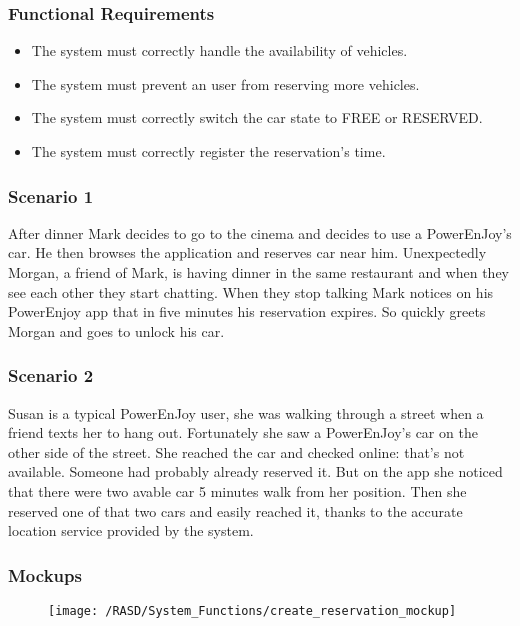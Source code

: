 \subsubsection{Functional Requirements}
\begin{itemize}
  \item The system must correctly handle the availability of vehicles.
  \item The system must prevent an user from reserving more vehicles.
  \item The system must correctly switch the car state to FREE or RESERVED.
  \item The system must correctly register the reservation's time.
\end{itemize}

\subsubsection{Scenario 1}
After dinner Mark decides to go to the cinema and decides to use a PowerEnJoy's car. He then browses the application and reserves car near him.
Unexpectedly Morgan, a friend of Mark, is having dinner in the same restaurant and when they see each other they start chatting. When they stop talking Mark notices on his PowerEnjoy app that in five minutes his reservation expires. So quickly greets Morgan and goes to unlock his car.

\subsubsection{Scenario 2}
Susan is a typical PowerEnJoy user, she was walking through a street when a friend texts her to hang out. Fortunately she saw a PowerEnJoy's car on the other side of the street. She reached the car and checked online: that's not available. Someone had probably already reserved it. But on the app she noticed that there were two avable car 5 minutes walk from her position. Then she reserved one of that two cars and easily reached it, thanks to the accurate location service provided by the system. 


\subsubsection{Mockups}
\begin{figure}[!ht]
  \centering
  \vspace{0.1cm}
  \texttt{[image: /RASD/System\_Functions/create\_reservation\_mockup]}\\
  \vspace{0.1cm}
  \label{fig:create_reservation_mockup} 
\end{figure}



